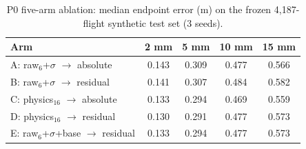 \begin{table}[htbp]
\centering
\caption{P0 five-arm ablation: median endpoint error (m) on the frozen 4,187-flight synthetic test set (3 seeds).}
\label{tab_p0_ablation_median}
\begin{tabular}{lcccc}
\toprule
Arm & 2 mm & 5 mm & 10 mm & 15 mm \\
\midrule
A: raw$_6$+$\sigma$ $\to$ absolute & 0.143 & 0.309 & 0.477 & 0.566 \\
B: raw$_6$+$\sigma$ $\to$ residual & 0.141 & 0.307 & 0.484 & 0.582 \\
C: physics$_{16}$ $\to$ absolute & 0.133 & 0.294 & 0.469 & 0.559 \\
D: physics$_{16}$ $\to$ residual & 0.130 & 0.291 & 0.477 & 0.573 \\
E: raw$_6$+$\sigma$+base $\to$ residual & 0.133 & 0.294 & 0.477 & 0.573 \\
\bottomrule
\end{tabular}
\end{table}
